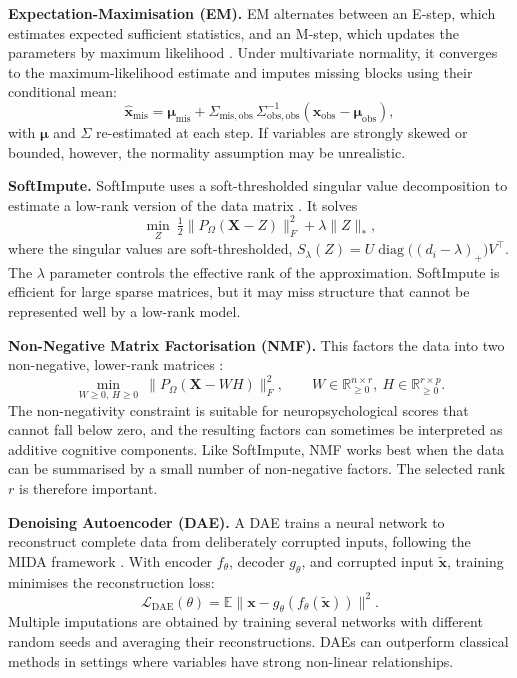 \textbf{Expectation-Maximisation (EM).} EM alternates between an E-step, which estimates expected sufficient statistics, and an M-step, which updates the parameters by maximum likelihood \parencite{dempster1977maximum}. Under multivariate normality, it converges to the maximum-likelihood estimate and imputes missing blocks using their conditional mean:
\begin{equation}\label{eq:em}
\hat{\mathbf{x}}_{\mathrm{mis}}=\boldsymbol\mu_{\mathrm{mis}}+\Sigma_{\mathrm{mis},\mathrm{obs}}\,\Sigma_{\mathrm{obs},\mathrm{obs}}^{-1}\!\left(\mathbf{x}_{\mathrm{obs}}-\boldsymbol\mu_{\mathrm{obs}}\right),
\end{equation}
with $\boldsymbol\mu$ and $\Sigma$ re-estimated at each step. If variables are strongly skewed or bounded, however, the normality assumption may be unrealistic.

\textbf{SoftImpute.} SoftImpute uses a soft-thresholded singular value decomposition to estimate a low-rank version of the data matrix \parencite{mazumder2010spectral}. It solves
\begin{equation}\label{eq:softimpute}
\min_{Z}\ \tfrac12\bigl\lVert P_\Omega(\mathbf{X}-Z)\bigr\rVert_F^2+\lambda\lVert Z\rVert_*,
\end{equation}
where the singular values are soft-thresholded, $S_\lambda(Z)=U\operatorname{diag}\bigl((d_i-\lambda)_+\bigr)V^\top$. The $\lambda$ parameter controls the effective rank of the approximation. SoftImpute is efficient for large sparse matrices, but it may miss structure that cannot be represented well by a low-rank model.

\textbf{Non-Negative Matrix Factorisation (NMF).} This factors the data into two non-negative, lower-rank matrices \parencite{lee1999learning}:
\begin{equation}\label{eq:nmf}
\min_{W\ge0,\,H\ge0}\ \bigl\lVert P_\Omega(\mathbf{X}-WH)\bigr\rVert_F^2,\qquad W\in\mathbb{R}^{n\times r}_{\ge0},\ H\in\mathbb{R}^{r\times p}_{\ge0}.
\end{equation}
The non-negativity constraint is suitable for neuropsychological scores that cannot fall below zero, and the resulting factors can sometimes be interpreted as additive cognitive components. Like SoftImpute, NMF works best when the data can be summarised by a small number of non-negative factors. The selected rank $r$ is therefore important.

\textbf{Denoising Autoencoder (DAE).} A DAE trains a neural network to reconstruct complete data from deliberately corrupted inputs, following the MIDA framework \parencite{gondara2018mida}. With encoder $f_\theta$, decoder $g_\theta$, and corrupted input $\tilde{\mathbf{x}}$, training minimises the reconstruction loss:
\begin{equation}\label{eq:dae}
\mathcal{L}_{\mathrm{DAE}}(\theta)=\mathbb{E}\bigl\lVert\mathbf{x}-g_\theta\!\left(f_\theta(\tilde{\mathbf{x}})\right)\bigr\rVert^2.
\end{equation}
Multiple imputations are obtained by training several networks with different random seeds and averaging their reconstructions. DAEs can outperform classical methods in settings where variables have strong non-linear relationships.

